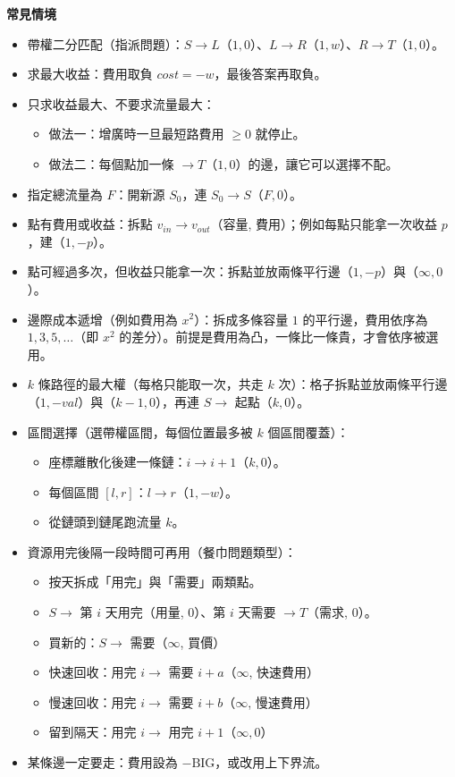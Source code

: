 {\large\bfseries 常見情境\par}
\medskip
\begin{itemize}
  \item 帶權二分匹配（指派問題）：$S \to L$（$1, 0$）、$L \to R$（$1, w$）、$R \to T$（$1, 0$）。
  \item 求最大收益：費用取負 $cost = -w$，最後答案再取負。
  \item 只求收益最大、不要求流量最大：
  \begin{itemize}
    \item 做法一：增廣時一旦最短路費用 $\ge 0$ 就停止。
    \item 做法二：每個點加一條 $\to T$（$1, 0$）的邊，讓它可以選擇不配。
  \end{itemize}
  \item 指定總流量為 $F$：開新源 $S_0$，連 $S_0 \to S$（$F, 0$）。
  \item 點有費用或收益：拆點 $v_{in} \to v_{out}$（容量, 費用）；例如每點只能拿一次收益 $p$，建（$1, -p$）。
  \item 點可經過多次，但收益只能拿一次：拆點並放兩條平行邊（$1, -p$）與（$\infty, 0$）。
  \item 邊際成本遞增（例如費用為 $x^2$）：拆成多條容量 $1$ 的平行邊，費用依序為 $1, 3, 5, \dots$（即 $x^2$ 的差分）。前提是費用為凸，一條比一條貴，才會依序被選用。
  \item $k$ 條路徑的最大權（每格只能取一次，共走 $k$ 次）：格子拆點並放兩條平行邊（$1, -val$）與（$k-1, 0$），再連 $S \to$ 起點（$k, 0$）。
  \item 區間選擇（選帶權區間，每個位置最多被 $k$ 個區間覆蓋）：
  \begin{itemize}
    \item 座標離散化後建一條鏈：$i \to i+1$（$k, 0$）。
    \item 每個區間 $[l, r]$：$l \to r$（$1, -w$）。
    \item 從鏈頭到鏈尾跑流量 $k$。
  \end{itemize}
  \item 資源用完後隔一段時間可再用（餐巾問題類型）：
  \begin{itemize}
    \item 按天拆成「用完」與「需要」兩類點。
    \item $S \to$ 第 $i$ 天用完（用量, $0$）、第 $i$ 天需要 $\to T$（需求, $0$）。
    \item 買新的：$S \to$ 需要（$\infty$, 買價）
    \item 快速回收：用完 $i \to$ 需要 $i+a$（$\infty$, 快速費用）
    \item 慢速回收：用完 $i \to$ 需要 $i+b$（$\infty$, 慢速費用）
    \item 留到隔天：用完 $i \to$ 用完 $i+1$（$\infty, 0$）
  \end{itemize}
  \item 某條邊一定要走：費用設為 $-\text{BIG}$，或改用上下界流。
\end{itemize}

